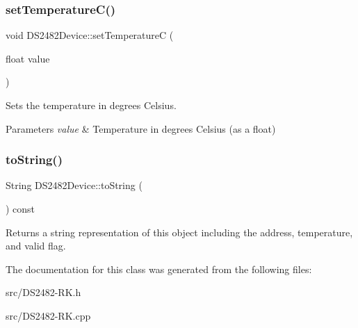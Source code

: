 \subsubsection{\texorpdfstring{set\+Temperature\+C()}{setTemperatureC()}}
{\footnotesize\ttfamily void D\+S2482\+Device\+::set\+TemperatureC (\begin{DoxyParamCaption}\item[{float}]{value }\end{DoxyParamCaption})\hspace{0.3cm}{\ttfamily [inline]}}



Sets the temperature in degrees Celsius. 


\begin{DoxyParams}{Parameters}
{\em value} & Temperature in degrees Celsius (as a float) \\
\hline
\end{DoxyParams}
\mbox{\label{class_d_s2482_device_aba40245ed81c0995c4c2de97ca5de032}} 
\subsubsection{\texorpdfstring{to\+String()}{toString()}}
{\footnotesize\ttfamily String D\+S2482\+Device\+::to\+String (\begin{DoxyParamCaption}{ }\end{DoxyParamCaption}) const}

Returns a string representation of this object including the address, temperature, and valid flag. 

The documentation for this class was generated from the following files\+:\begin{DoxyCompactItemize}
\item 
src/D\+S2482-\/\+R\+K.\+h\item 
src/D\+S2482-\/\+R\+K.\+cpp\end{DoxyCompactItemize}
